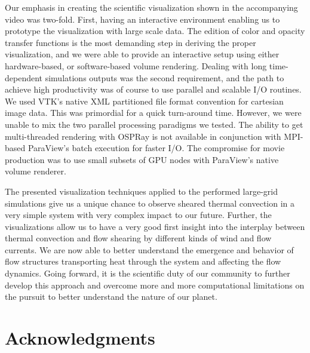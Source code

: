 \documentclass[5p,times]{elsarticle}
\begin{document}
Our emphasis in creating the scientific visualization shown in the accompanying video was two-fold. 
First, having an interactive environment enabling us to prototype the visualization with large scale data. The edition of color and opacity transfer functions is the most demanding step in
deriving the proper visualization, and we were able to provide an interactive setup using either hardware-based, or software-based volume rendering. Dealing with long time-dependent simulations outputs was the second requirement, and the path to achieve high productivity was of course to use parallel and scalable I/O routines. We used VTK's native XML partitioned file format convention for cartesian image data. This was primordial for a quick turn-around time. However, we were unable to mix the two parallel processing paradigms we tested. The ability to get multi-threaded rendering with OSPRay is not available in conjunction with MPI-based ParaView's batch execution for faster I/O. The compromise for movie production was to use small subsets of GPU nodes with ParaView's native volume renderer.

The presented visualization techniques applied to the performed large-grid simulations give us a unique chance to observe sheared thermal convection in a very simple system with very complex impact to our future. Further, the visualizations allow us to have a very good first insight into the interplay between thermal convection and flow shearing by different kinds of wind and flow currents. We are now able to better understand the emergence and behavior of flow structures transporting heat through the system and affecting the flow dynamics. Going forward, it is the scientific duty of our community to further develop this approach and overcome more and more computational limitations on the pursuit to better understand the nature of our planet.  




\section*{Acknowledgments}
\end{document}
